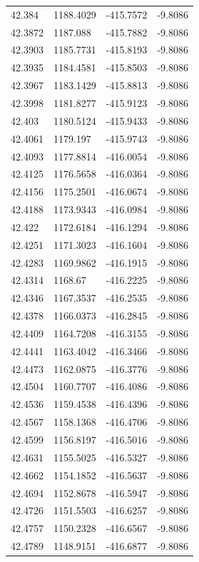\begin{table}[H]
\begin{tabular}{llll}
42.384 & 1188.4029 & -415.7572 & -9.8086 \\
42.3872 & 1187.088 & -415.7882 & -9.8086 \\
42.3903 & 1185.7731 & -415.8193 & -9.8086 \\
42.3935 & 1184.4581 & -415.8503 & -9.8086 \\
42.3967 & 1183.1429 & -415.8813 & -9.8086 \\
42.3998 & 1181.8277 & -415.9123 & -9.8086 \\
42.403 & 1180.5124 & -415.9433 & -9.8086 \\
42.4061 & 1179.197 & -415.9743 & -9.8086 \\
42.4093 & 1177.8814 & -416.0054 & -9.8086 \\
42.4125 & 1176.5658 & -416.0364 & -9.8086 \\
42.4156 & 1175.2501 & -416.0674 & -9.8086 \\
42.4188 & 1173.9343 & -416.0984 & -9.8086 \\
42.422 & 1172.6184 & -416.1294 & -9.8086 \\
42.4251 & 1171.3023 & -416.1604 & -9.8086 \\
42.4283 & 1169.9862 & -416.1915 & -9.8086 \\
42.4314 & 1168.67 & -416.2225 & -9.8086 \\
42.4346 & 1167.3537 & -416.2535 & -9.8086 \\
42.4378 & 1166.0373 & -416.2845 & -9.8086 \\
42.4409 & 1164.7208 & -416.3155 & -9.8086 \\
42.4441 & 1163.4042 & -416.3466 & -9.8086 \\
42.4473 & 1162.0875 & -416.3776 & -9.8086 \\
42.4504 & 1160.7707 & -416.4086 & -9.8086 \\
42.4536 & 1159.4538 & -416.4396 & -9.8086 \\
42.4567 & 1158.1368 & -416.4706 & -9.8086 \\
42.4599 & 1156.8197 & -416.5016 & -9.8086 \\
42.4631 & 1155.5025 & -416.5327 & -9.8086 \\
42.4662 & 1154.1852 & -416.5637 & -9.8086 \\
42.4694 & 1152.8678 & -416.5947 & -9.8086 \\
42.4726 & 1151.5503 & -416.6257 & -9.8086 \\
42.4757 & 1150.2328 & -416.6567 & -9.8086 \\
42.4789 & 1148.9151 & -416.6877 & -9.8086 \\

\end{tabular}
\end{table}
